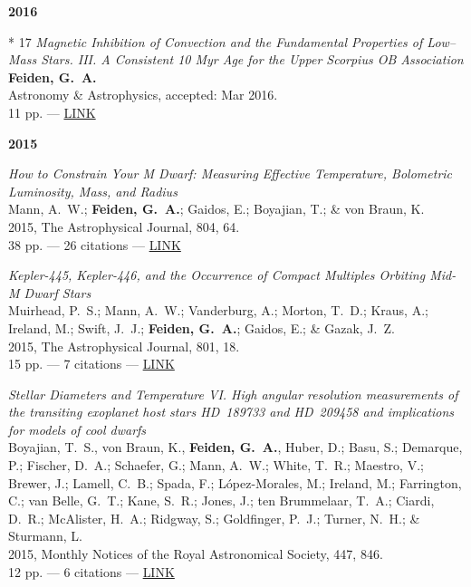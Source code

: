 \documentclass[11pt,a4paper]{article}
\begin{document}
\begin{etaremune}[leftmargin=0.4in]

	\item[{\bf 2016}]

	\item[* 17] \emph{Magnetic Inhibition of Convection and the Fundamental Properties of Low--Mass Stars. III. A Consistent 10 Myr Age for the Upper Scorpius OB Association} \\
		{\bf Feiden, G.~A.} \\
		Astronomy \& Astrophysics, accepted: Mar 2016. \\
		11 pp. --- \href{http://}{LINK}
	
	\item[{\bf 2015}]
	
	\item \emph{How to Constrain Your M Dwarf: Measuring Effective Temperature, Bolometric Luminosity, Mass, and Radius} \\
		Mann, A.~W.; {\bf Feiden, G.~A.}; Gaidos, E.; Boyajian, T.; \& von Braun, K. \\
		2015, The Astrophysical Journal, 804, 64. \\
		38 pp. --- 26 citations --- \href{http://adsabs.harvard.edu/abs/2015ApJ...804...64M}{LINK}
		
	\item \emph{Kepler-445, Kepler-446, and the Occurrence of Compact Multiples Orbiting Mid-M Dwarf Stars} \\
		Muirhead, P.~S.; Mann, A.~W.; Vanderburg, A.; Morton, T.~D.; Kraus, A.; Ireland, M.; Swift, J.~J.; {\bf Feiden, G.~A.}; Gaidos, E.; \& Gazak, J.~Z. \\ 
		2015, The Astrophysical Journal, 801, 18. \\
		15 pp. --- 7 citations --- \href{http://adsabs.harvard.edu/abs/2015ApJ...801...18M}{LINK}
	
	\item \emph{Stellar Diameters and Temperature VI. High angular resolution measurements of the transiting exoplanet host stars HD~189733 and HD~209458 and implications for models of cool dwarfs} \\
		Boyajian, T.~S., von Braun, K., {\bf Feiden, G.~A.}, Huber, D.; Basu, S.; Demarque, P.; Fischer, D.~A.; Schaefer, G.; Mann, A.~W.; White, T.~R.; Maestro, V.; Brewer, J.; Lamell, C.~B.; Spada, F.; L\'{o}pez-Morales, M.; Ireland, M.; Farrington, C.; van Belle, G.~T.; Kane, S.~R.; Jones, J.; ten Brummelaar, T.~A.; Ciardi, D.~R.; McAlister, H.~A.; Ridgway, S.; Goldfinger, P.~J.; Turner, N.~H.; \& Sturmann, L. \\
		2015, Monthly Notices of the Royal Astronomical Society, 447, 846. \\
		12 pp. --- 6 citations --- \href{http://adsabs.harvard.edu/abs/2015MNRAS.447..846B}{LINK}


\end{etaremune}
\end{document}
